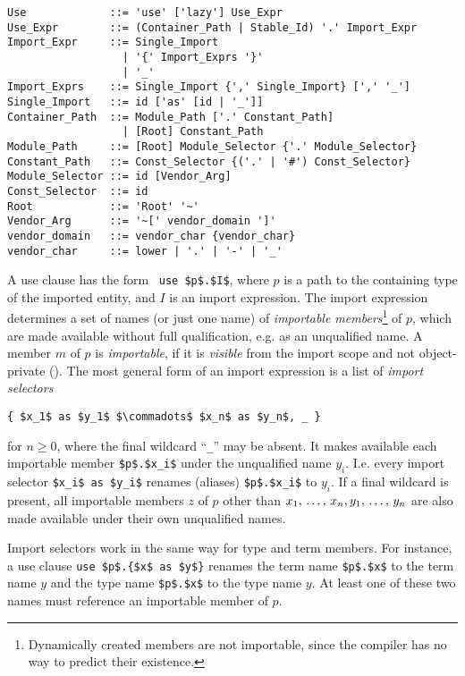 \syntax\begin{lstlisting}
Use             ::= 'use' ['lazy'] Use_Expr
Use_Expr        ::= (Container_Path | Stable_Id) '.' Import_Expr
Import_Expr     ::= Single_Import
                  | '{' Import_Exprs '}'
                  | '_'
Import_Exprs    ::= Single_Import {',' Single_Import} [',' '_']
Single_Import   ::= id ['as' [id | '_']]
Container_Path  ::= Module_Path ['.' Constant_Path]
                  | [Root] Constant_Path
Module_Path     ::= [Root] Module_Selector {'.' Module_Selector}
Constant_Path   ::= Const_Selector {('.' | '#') Const_Selector}
Module_Selector ::= id [Vendor_Arg]
Const_Selector  ::= id
Root            ::= 'Root' '~'
Vendor_Arg      ::= '~[' vendor_domain ']'
vendor_domain   ::= vendor_char {vendor_char}
vendor_char     ::= lower | '.' | '-' | '_'
\end{lstlisting}

A use clause has the form ~\lstinline!use $p$.$I$!, where $p$ is a path to the containing type of the imported entity, and $I$ is an import expression. The import expression determines a set of names (or just one name) of {\em importable members}\footnote{Dynamically created members are not importable, since the compiler has no way to predict their existence.} of $p$, which are made available without full qualification, e.g. as an unqualified name. A member $m$ of $p$ is {\em importable}, if it is {\em visible} from the import scope and not object-private (). The most general form of an import expression is a list of {\em import selectors}
\begin{lstlisting}
{ $x_1$ as $y_1$ $\commadots$ $x_n$ as $y_n$, _ }
\end{lstlisting}
for $n \ge 0$, where the final wildcard ``\lstinline!_!'' may be absent. It makes available each importable member \lstinline!$p$.$x_i$! under the unqualified name $y_i$. I.e. every import selector \lstinline!$x_i$ as $y_i$! renames (aliases) \lstinline!$p$.$x_i$! to $y_i$. If a final wildcard is present, all importable members $z$ of $p$ other than $x_1 ,\, \ldots ,\, x_n, y_1 ,\, \ldots ,\, y_n$ are also made available under their own unqualified names. 

Import selectors work in the same way for type and term members. For instance, a use clause \lstinline!use $p$.{$x$ as $y$}! renames the term name \lstinline!$p$.$x$! to the term name $y$ and the type name \lstinline!$p$.$x$! to the type name $y$. At least one of these two names must reference an importable member of $p$. 

